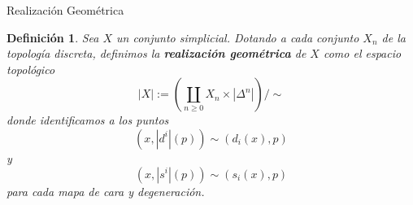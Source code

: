 \documentclass[11pt]{beamer}
\newcommand{\N}{\mathbb{N}}
\newcommand{\nat}[1]{[\![#1]\!]}
\newcommand{\ord}[1]{\nat{#1}}
\newcommand{\cat}[1]{\mathsf{#1}}
\renewcommand{\ss}[1]{\Delta^{#1}}
\newcommand{\homcomplex}{\mathbf{Hom}}
\newtheorem{defs}{Definición}
\newtheorem{teo}{Teorema}
\begin{document}
%
%
%


\begin{frame}{Realización Geométrica}
\begin{defs} Sea $X$ un conjunto simplicial. Dotando a cada conjunto $X_n$ de la topología discreta, definimos la \textbf{realización geométrica} de $X$ como el espacio topológico 
\[
|X| := \left(\coprod_{n \geq 0}X_n \times |\ss{n}|\right)\Big/\sim
\]
donde identificamos a los puntos \[(x,|d^i|(p)) \sim (d_i(x),p)\] y \[(x,|s^i|(p)) \sim (s_i(x),p)\] para cada mapa de cara y degeneración.
\end{defs}
\end{frame}
\end{document}
